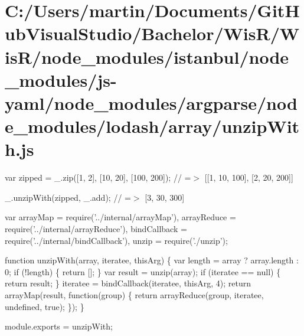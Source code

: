 \hypertarget{_c_1_2_users_2martin_2_documents_2_git_hub_visual_studio_2_bachelor_2_wis_r_2_wis_r_2node_moduled3f4649f1d13ab701256cd7ab45cacfc}{}\section{C\+:/\+Users/martin/\+Documents/\+Git\+Hub\+Visual\+Studio/\+Bachelor/\+Wis\+R/\+Wis\+R/node\+\_\+modules/istanbul/node\+\_\+modules/js-\/yaml/node\+\_\+modules/argparse/node\+\_\+modules/lodash/array/unzip\+With.\+js}
var zipped = \+\_\+.\+zip(\mbox{[}1, 2\mbox{]}, \mbox{[}10, 20\mbox{]}, \mbox{[}100, 200\mbox{]}); // =$>$ \mbox{[}\mbox{[}1, 10, 100\mbox{]}, \mbox{[}2, 20, 200\mbox{]}\mbox{]}

\+\_\+.\+unzip\+With(zipped, \+\_\+.\+add); // =$>$ \mbox{[}3, 30, 300\mbox{]}


\begin{DoxyCodeInclude}
var arrayMap = require(\textcolor{stringliteral}{'../internal/arrayMap'}),
    arrayReduce = require(\textcolor{stringliteral}{'../internal/arrayReduce'}),
    bindCallback = require(\textcolor{stringliteral}{'../internal/bindCallback'}),
    unzip = require(\textcolor{stringliteral}{'./unzip'});

\textcolor{keyword}{function} unzipWith(array, iteratee, thisArg) \{
  var length = array ? array.length : 0;
  \textcolor{keywordflow}{if} (!length) \{
    \textcolor{keywordflow}{return} [];
  \}
  var result = unzip(array);
  \textcolor{keywordflow}{if} (iteratee == null) \{
    \textcolor{keywordflow}{return} result;
  \}
  iteratee = bindCallback(iteratee, thisArg, 4);
  \textcolor{keywordflow}{return} arrayMap(result, \textcolor{keyword}{function}(group) \{
    \textcolor{keywordflow}{return} arrayReduce(group, iteratee, undefined, \textcolor{keyword}{true});
  \});
\}

module.exports = unzipWith;
\end{DoxyCodeInclude}
 